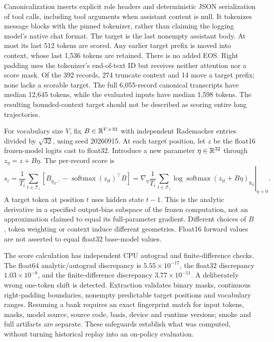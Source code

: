 Canonicalization inserts explicit role headers and deterministic JSON serialization of tool calls, including tool arguments when assistant content is null. It tokenizes message blocks with the pinned tokenizer, rather than claiming the logging model's native chat format. The target is the last nonempty assistant body. At most its last 512 tokens are scored. Any earlier target prefix is moved into context, whose last 1,536 tokens are retained. There is no added EOS. Right padding uses the tokenizer's end-of-text ID but receives neither attention nor a score mask. Of the 392 records, 274 truncate context and 14 move a target prefix; none lacks a scorable target. The full 6,055-record canonical transcripts have median 12,645 tokens, while the evaluated inputs have median 1,598 tokens. The resulting bounded-context target should not be described as scoring entire long trajectories.

For vocabulary size $V$, fix $B\in\mathbb R^{V\times32}$ with independent Rademacher entries divided by $\sqrt{32}$, using seed 20260915. At each target position, let $z$ be the float16 frozen-model logits cast to float32. Introduce a new parameter $\eta\in\mathbb R^{32}$ through $z_\eta=z+B\eta$. The per-record score is
\begin{equation}\label{eq:biasscore}
 s_i=\frac1{T_i}\sum_{t\in\mathcal T_i}
 \left[B_{y_{it},:}-\operatorname{softmax}(z_{it})^\top B\right]
 =\left.\nabla_\eta\frac1{T_i}\sum_{t\in\mathcal T_i}
 \log\operatorname{softmax}(z_{it}+B\eta)_{y_{it}}\right|_{\eta=0}.
\end{equation}
A target token at position $t$ uses hidden state $t-1$. This is the analytic derivative in a specified output-bias subspace of the frozen computation, not an approximation claimed to equal its full-parameter gradient. Different choices of $B$, token weighting or context induce different geometries. Float16 forward values are not asserted to equal float32 base-model values.

The score calculation has independent CPU autograd and finite-difference checks. The float64 analytic/autograd discrepancy is $5.55\times10^{-17}$, the float32 discrepancy $1.03\times10^{-8}$, and the finite-difference discrepancy $3.77\times10^{-11}$. A deliberately wrong one-token shift is detected. Extraction validates binary masks, continuous right-padding boundaries, nonempty predictable target positions and vocabulary ranges. Resuming a bank requires an exact fingerprint match for input tokens, masks, model source, source code, basis, device and runtime versions; smoke and full artifacts are separate. These safeguards establish what was computed, without turning historical replay into an on-policy evaluation.

